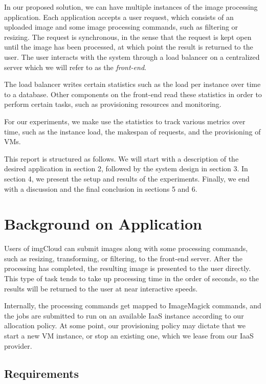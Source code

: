 \documentclass[conference]{IEEEtran}
\begin{document}
In our proposed solution, we can have multiple instances of the image processing application. Each application accepts a user request, which consists of an uploaded image and some image processing commands, such as filtering or resizing. The request is synchronous, in the sense that the request is kept open until the image has been processed, at which point the result is returned to the user. The user interacts with the system through a load balancer on a centralized server which we will refer to as the \emph{front-end}.

The load balancer writes certain statistics such as the load per instance over time to a database. Other components on the front-end read these statistics in order to perform certain tasks, such as provisioning resources and monitoring.

For our experiments, we make use the statistics to track various metrics over time, such as the instance load, the makespan of requests, and the provisioning of VMs.

This report is structured as follows. We will start with a description of the desired application in section 2, followed by the system design in section 3. In section 4, we present the setup and results of the experiments. Finally, we end with a discussion and the final conclusion in sections 5 and 6.

\section{Background on Application}

Users of imgCloud can submit images along with some processing commands, such as resizing, transforming, or filtering, to the front-end server. After the processing has completed, the resulting image is presented to the user directly. This type of task tends to take up processing time in the order of seconds, so the results will be returned to the user at near interactive speeds.

Internally, the processing commands get mapped to ImageMagick commands, and the jobs are submitted to run on an available IaaS instance according to our allocation policy. At some point, our provisioning policy may dictate that we start a new VM instance, or stop an existing one, which we lease from our IaaS provider.


\subsection{Requirements}
\end{document}
